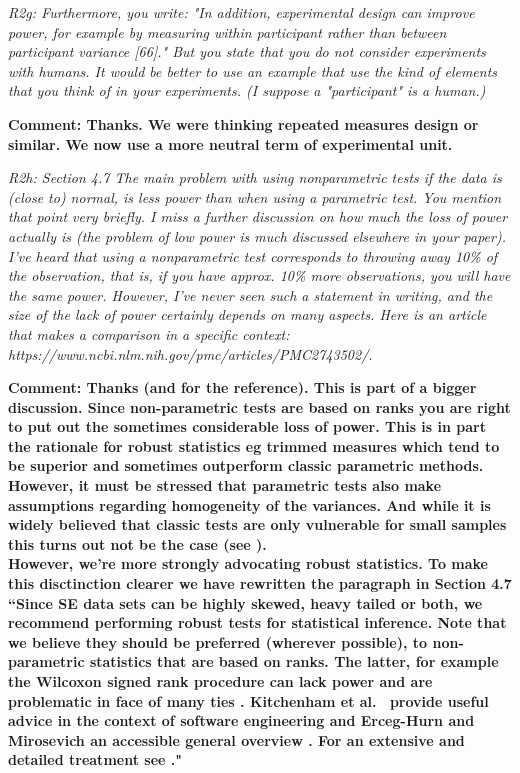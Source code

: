 \documentclass[preprint,10pt]{elsarticle}
\newcommand{\RED}{\color{red}}
\newcommand{\BLACK}{\color{black}}
\begin{document}
{\em
R2g:
Furthermore, you write: "In addition, experimental design can improve power, for example by measuring within participant rather than between participant variance [66]." But you state that you do not consider experiments with humans. It would be better to use an example that use the kind of elements that you think of in your experiments. (I suppose a "participant" is a human.)
}

{\bf Comment: Thanks.  We were thinking repeated measures design or similar.  We now use a more neutral term of experimental unit.}

{\em
R2h:
Section 4.7
The main problem with using nonparametric tests if the data is (close to) normal, is less power than when using a parametric test. You mention that point very briefly. I miss a further discussion on how much the loss of power actually is (the problem of low power is much discussed elsewhere in your paper). I've heard that using a nonparametric test corresponds to throwing away 10\% of the observation, that is, if you have approx. 10\% more observations, you will have the same power. However, I've never seen such a statement in writing, and the size of the lack of power certainly depends on many aspects. Here is an article that makes a comparison in a specific context: https://www.ncbi.nlm.nih.gov/pmc/articles/PMC2743502/.
}

{\bf Comment: Thanks (and for the reference). This is part of a bigger discussion.  Since non-parametric tests are based on ranks you are right to put out the sometimes considerable loss of power.  This is in part the rationale for robust statistics eg trimmed measures which tend to be superior and sometimes outperform classic parametric methods.  However, it must be stressed that parametric tests \textbf{also} make assumptions regarding homogeneity of the variances.  And while it is widely believed that classic tests are only vulnerable for small samples this turns out not be the case (see \cite{Erce08,Wilc98}). \\
However, we're more strongly advocating robust statistics.  To make this disctinction clearer we have rewritten the paragraph in Section 4.7\\
``Since SE data sets can be highly skewed, heavy tailed or both, \RED we recommend performing robust tests for statistical inference. Note that we believe they should be preferred (wherever possible), to non-parametric statistics that are based on ranks. The latter, \BLACK for example the Wilcoxon signed rank procedure can lack power and are problematic in face of many ties \cite{Blai85}.  Kitchenham et al.~\cite{Kitc17} provide useful advice in the context of software engineering and Erceg-Hurn and Mirosevich an accessible general overview \cite{Erce08}.  For an extensive and detailed treatment see \cite{Wilc12}."
}
\end{document}
